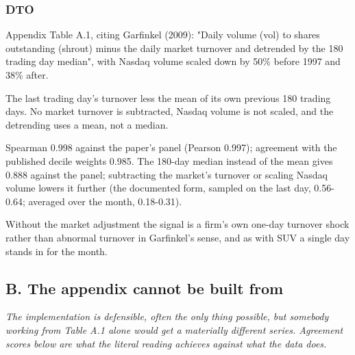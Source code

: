 \documentclass[11pt]{article}
\begin{document}
\subsubsection*{DTO}
\begin{description}[leftmargin=2.4cm,labelwidth=2.2cm,font=\normalfont\bfseries,style=sameline]
\item[Documented:] Appendix Table A.1, citing Garfinkel (2009): "Daily volume (vol) to shares outstanding (shrout) minus the daily market turnover and detrended by the 180 trading day median", with Nasdaq volume scaled down by 50\% before 1997 and 38\% after.
\item[Implemented:] The last trading day's turnover less the mean of its own previous 180 trading days. No market turnover is subtracted, Nasdaq volume is not scaled, and the detrending uses a mean, not a median.
\item[Evidence:] Spearman 0.998 against the paper's panel (Pearson 0.997); agreement with the published decile weights 0.985. The 180-day median instead of the mean gives 0.888 against the panel; subtracting the market's turnover or scaling Nasdaq volume lowers it further (the documented form, sampled on the last day, 0.56-0.64; averaged over the month, 0.18-0.31).
\item[Why it matters:] Without the market adjustment the signal is a firm's own one-day turnover shock rather than abnormal turnover in Garfinkel's sense, and as with SUV a single day stands in for the month.
\end{description}
\subsection*{B. The appendix cannot be built from}
\emph{The implementation is defensible, often the only thing possible, but somebody working from Table A.1 alone would get a materially different series. Agreement scores below are what the literal reading achieves against what the data does.}
\end{document}
